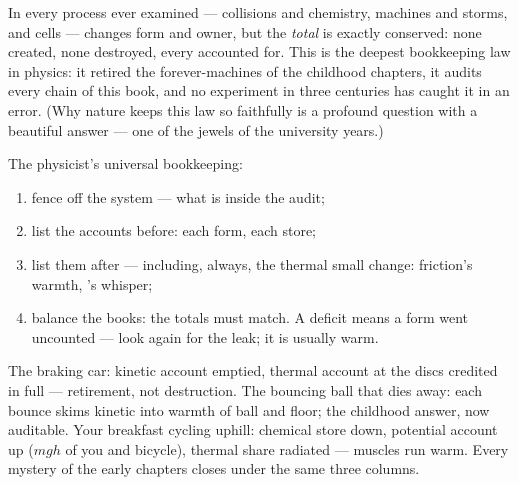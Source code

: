 \begin{proposition}\label{prop:g9:energy-conversions:conservation}
In every process ever examined --- collisions and chemistry,
machines and storms,  and cells ---  changes form
and owner, but the \emph{total} is exactly conserved: none
created, none destroyed, every  accounted for. This is
the deepest bookkeeping law in physics: it retired the
forever-machines of the childhood chapters, it audits every
chain of this book, and no experiment in three centuries has
caught it in an error. (Why nature keeps this law so
faithfully is a profound question with a beautiful answer ---
one of the jewels of the university years.)
\end{proposition}

\begin{method}\label{met:g9:energy-conversions:audit}
The physicist's universal bookkeeping:
\begin{enumerate}
  \item fence off the system --- what is inside the audit;
  \item list the  accounts before: each form, each
        store;
  \item list them after --- including, always, the thermal
        small change: friction's warmth, 's whisper;
  \item balance the books: the totals must match. A deficit
        means a form went uncounted --- look again for the
        leak; it is usually warm.
\end{enumerate}
\end{method}

\begin{example}\label{ex:g9:energy-conversions:audits}
The braking car: kinetic account emptied, thermal account
at the discs credited in full --- retirement, not
destruction. The bouncing ball that dies away: each bounce
skims kinetic into warmth of ball and floor; the childhood
answer, now auditable. Your breakfast cycling uphill:
chemical store down, potential account up ($m g h$ of you
and bicycle), thermal share radiated --- muscles run warm.
Every mystery of the early  chapters closes under the
same three columns.
\end{example}

